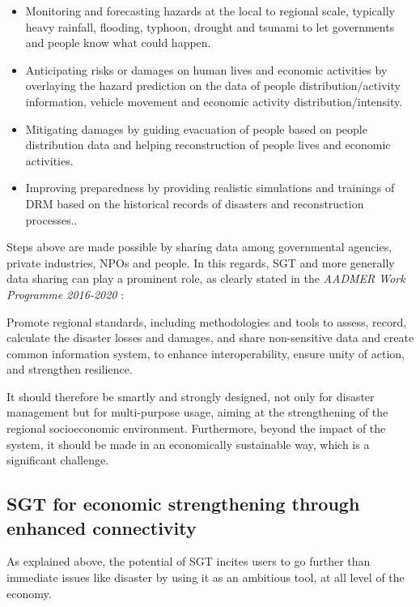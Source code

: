 \begin{itemize}
\item Monitoring and forecasting hazards at the local to regional scale, typically heavy rainfall, flooding, typhoon, drought and tsunami to let governments and people know what could happen.
\item Anticipating risks or damages on human lives and economic activities by overlaying the hazard prediction on the data of people distribution/activity information, vehicle movement and economic activity distribution/intensity.
\item Mitigating damages by guiding evacuation of people based on people distribution data and helping reconstruction of people lives and economic activities.
\item Improving preparedness by providing realistic simulations and trainings of DRM based on the historical records of disasters and reconstruction processes..
\end{itemize}

Steps above are made possible by sharing data among governmental agencies, private industries, NPOs and people. In this regards, SGT and more generally data sharing can play a prominent role, as clearly stated in the \textit{AADMER Work Programme 2016-2020} \cite{aadmer_wp}:

\begin{displayquote}

Promote regional standards, including methodologies and tools to assess, record, calculate the disaster losses and damages, and share non-sensitive data and create common information system, to enhance interoperability, ensure unity of action, and strengthen resilience.

\end{displayquote}

It should therefore be smartly and strongly designed, not only for disaster management but for multi-purpose usage, aiming at the strengthening of the regional  socioeconomic environment. Furthermore, beyond the impact of the system, it should be made in an economically sustainable way, which is a significant challenge.


\subsection{SGT for economic strengthening through enhanced connectivity} \label{enhanced}

As explained above, the potential of SGT incites users to go further than immediate issues like disaster by using it as an ambitious tool, at all level of the economy.

